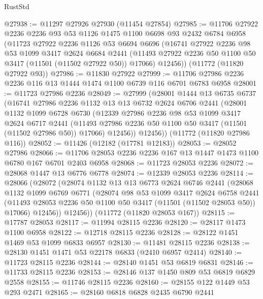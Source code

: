 \begin{lexlean}{RustStd}
\begin{coremodule}
@27938 := @11297 @27926 @27930 (@11454 @27854)
@27985 := @11706
    @27922
    @2236
    @2236
    @93
    @53
    @1126
    @1475
    @1100
    @6698
    @93
    @2432
    @6784
    @6958
    (@11723
      @27922
      @2236
      @1126
      @53
      @6694
      @6696
      (@16741
        @27922
        @2236
        @98
        @53
        @1099
        @3417
        @2624
        @6684
        @2441
        (@11493 @27922 @2236 @50 @1100 @50 @3417 (@11501 (@11502 @27922 @50)) @17066)
        @12456))
    (@11772 (@11820 @27922 @93))
@27986 := @11830 @27922
@27999 := @11706 @27986 @2236 @2236 @116 @13 @1444 @1474 @1100 @6739 @116 @6701 @6783 @6958
@28001 := @11723 @27986 @2236
@28049 := @27999
    (@28001
      @1444
      @13
      @6735
      @6737
      (@16741
        @27986
        @2236
        @1132
        @13
        @13
        @6732
        @2624
        @6706
        @2441
        (@28001
          @1132
          @1099
          @6728
          @6730
          (@12339
            @27986
            @2236
            @98
            @53
            @1099
            @3417
            @2624
            @6717
            @2441
            (@11493 @27986 @2236 @50 @1100 @50 @3417 (@11501 (@11502 @27986 @50)) @17066)
            @12456))
        @12456))
    (@11772 (@11820 @27986 @116))
@28052 := @11426 (@12182 (@17781 @12183))
@28053 := @28052 @27986
@28066 := @11706 @28053 @2236 @2236 @167 @13 @1447 @1473 @1100 @6780 @167 @6701 @2403 @6958
@28068 := @11723 @28053 @2236
@28072 := @28068 @1447 @13 @6776 @6778
@28074 := @12339 @28053 @2236
@28114 := @28066
    (@28072
      (@28074
        @1132
        @13
        @13
        @6773
        @2624
        @6746
        @2441
        (@28068
          @1132
          @1099
          @6769
          @6771
          (@28074
            @98
            @53
            @1099
            @3417
            @2624
            @6758
            @2441
            (@11493 @28053 @2236 @50 @1100 @50 @3417 (@11501 (@11502 @28053 @50)) @17066)
            @12456))
        @12456))
    (@11772 (@11820 @28053 @167))
@28115 := @17787 @28053
@28117 := @11994 @28115 @2236
@28120 := @28117 @1473 @1100 @6958
@28122 := @12718 @28115 @2236
@28128 := @28122 @1451 @1469 @53 @1099 @6833 @6957
@28130 := @11481 @28115 @2236
@28138 := @28130 @1451 @1471 @53 @22178 @6833 (@2410 @6957 @2414)
@28140 := @11723 @28115 @2236
@28144 := @28140 @1451 @53 @6819 @6831
@28146 := @11733 @28115 @2236
@28153 := @28146 @137 @1450 @809 @53 @6819 @6829 @2558
@28155 := @11746 @28115 @2236
@28160 := @28155 @122 @1449 @53 @293 @2471
@28165 := @28160 @6818 @6828 @2435 @6790 @2441

\end{coremodule}
\end{lexlean}
